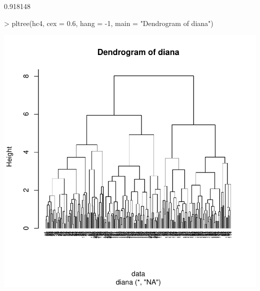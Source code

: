 \documentclass [a4paper] {article}
\begin{document}
\begin{Schunk}
\begin{Soutput}
[1] 0.918148
\end{Soutput}
\begin{Sinput}
> pltree(hc4, cex = 0.6, hang = -1, main = "Dendrogram of diana")
\end{Sinput}
\end{Schunk}
\includegraphics{entrega-jerarquico_3}
\end{document}
